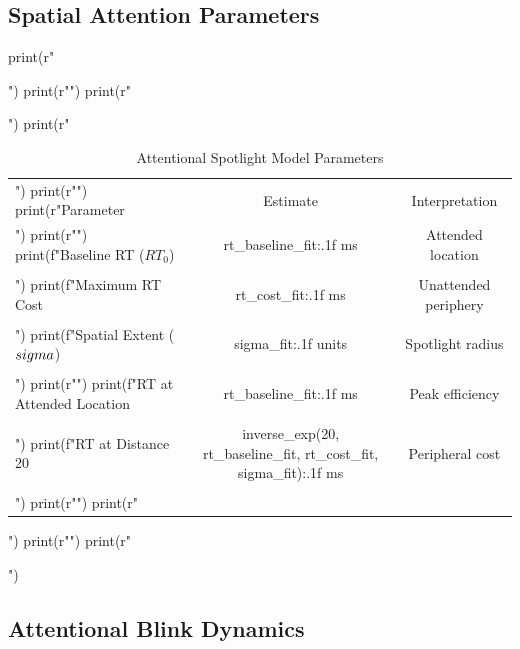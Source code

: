 \documentclass[a4paper, 11pt]{article}
\begin{document}
\subsection{Spatial Attention Parameters}

\begin{pycode}
print(r"\begin{table}[htbp]")
print(r"\centering")
print(r"\caption{Attentional Spotlight Model Parameters}")
print(r"\begin{tabular}{lcc}")
print(r"\toprule")
print(r"Parameter & Estimate & Interpretation \\")
print(r"\midrule")
print(f"Baseline RT ($RT_0$) & {rt_baseline_fit:.1f} ms & Attended location \\\\")
print(f"Maximum RT Cost & {rt_cost_fit:.1f} ms & Unattended periphery \\\\")
print(f"Spatial Extent ($\\sigma$) & {sigma_fit:.1f} units & Spotlight radius \\\\")
print(r"\midrule")
print(f"RT at Attended Location & {rt_baseline_fit:.1f} ms & Peak efficiency \\\\")
print(f"RT at Distance 20 & {inverse_exp(20, rt_baseline_fit, rt_cost_fit, sigma_fit):.1f} ms & Peripheral cost \\\\")
print(r"\bottomrule")
print(r"\end{tabular}")
print(r"\label{tab:spotlight}")
print(r"\end{table}")
\end{pycode}

\subsection{Attentional Blink Dynamics}
\end{document}
